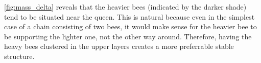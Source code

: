 \documentclass[a4paper,10pt]{article}
\begin{document}
\begin{multicols}{2}
    \autoref{fig:mass_delta} reveals that the heavier bees (indicated by the darker shade) tend to be situated
    near the queen. This is natural because even in the simplest case of a chain consisting of two bees, it would
    make sense for the heavier bee to be supporting the lighter one, not the other way around. Therefore, having
    the heavy bees clustered in the upper layers creates a more preferrable stable structure.


\end{multicols}
\end{document}
